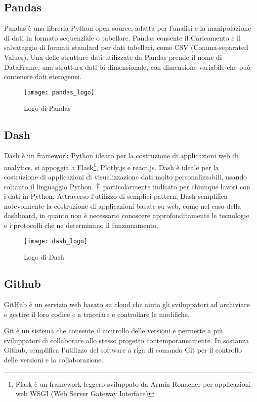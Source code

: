 \subsection{Pandas}
Pandas è una libreria Python open source, adatta per l’analisi e la manipolazione di dati in formato sequenziale o tabellare.
Pandas consente il Caricamento e il salvataggio di formati standard per dati tabellari, come CSV (Comma-separated Values).
Una delle strutture dati utilizzate da Pandas prende il nome di DataFrame, una struttura dati bi-dimensionale, con dimensione variabile che può contenere dati eterogenei.
\begin{figure}[htp]
    \centering
    \texttt{[image: pandas\_logo]}
    \caption{Logo di Pandas}
\end{figure}

\subsection{Dash}
Dash è un framework Python ideato per la costruzione di applicazioni web di analytics, si appoggia a Flask\footnote{Flask è un framework leggero sviluppato da Armin Ronacher per applicazioni web WSGI
(Web Server Gateway Interface)}, Plotly.js e react.js\footnotemark.
Dash è ideale per la costruzione di applicazioni di visualizzazione dati molto personalizzabili, usando soltanto il linguaggio Python. 
È particolarmente indicato per chiunque lavori con i dati in Python.
Attraverso l’utilizzo di semplici pattern, Dash semplifica notevolmente la costruzione di applicazioni basate su web, come nel caso della dashboard, in quanto non è necessario conoscere approfonditamente le tecnologie e i protocolli che ne determinano il funzionamento.

\begin{figure}[htp]
    \centering
    \texttt{[image: dash\_logo]}
    \caption{Logo di Dash}
\end{figure}


\subsection{Github}
\noindent GitHub è un servizio web basato su cloud che aiuta gli sviluppatori ad archiviare e gestire il loro codice e a tracciare e controllare le modifiche.

\noindent Git è un sistema che consente il controllo delle versioni e permette a più sviluppatori di collaborare allo stesso progetto contemporaneamente.
\noindent In sostanza Github, semplifica l’utilizzo del software a riga di comando Git per il controllo delle versioni e la collaborazione.


